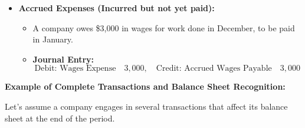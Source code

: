 \documentclass[12pt,a4paper]{book}
\begin{document}
\begin{itemize}
\begin{itemize}
        \item \textbf{Accrued Expenses (Incurred but not yet paid):}
        \begin{itemize}
            \item A company owes \$3,000 in wages for work done in December, to be paid in January.
            \item \textbf{Journal Entry:}
            \[
            \text{Debit: Wages Expense} \quad 3,000, \quad \text{Credit: Accrued Wages Payable} \quad 3,000
            \]
        \end{itemize}
    \end{itemize}
\end{itemize}

\vspace{0.5cm}
\textbf{Example of Complete Transactions and Balance Sheet Recognition:}

Let's assume a company engages in several transactions that affect its balance sheet at the end of the period.
\end{document}
